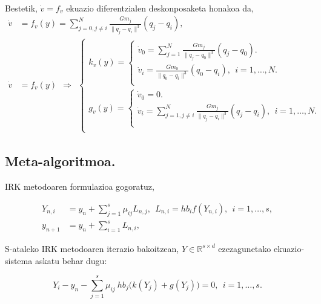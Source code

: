 \paragraph*{}Bestetik, $\dot{v}=f_v$ ekuazio diferentzialen deskonposaketa honakoa da,
\begin{align*}
\dot{v} &=f_v(y)=\sum_{j=0,j \neq i}^{N} \frac{Gm_j}{\|q_j-q_i\|^3} (q_j-q_i), \\
\dot{v} &=f_v(y) \ \ \Rightarrow \ \ 
\left \{ \begin{array}{c}
          k_v(y)=\left \{ \begin{array}{c}
           \dot{v}_0 =\sum_{j=1}^{N} \frac{Gm_j}{\|q_j-q_0\|^3} (q_j-q_0). \\[.30cm]
           \dot{v}_i = \frac{Gm_0}{\|q_0-q_i\|^3} (q_0-q_i), \ \  i=1,\dots,N.\\[.30cm]
         \end{array} \right. \\[.30cm]  
          g_v(y)=\left \{ \begin{array}{c}
             \dot{v}_0=0. \\[.30cm]
             \dot{v}_i= \sum_{j=1,j \neq i}^{N} \frac{Gm_j}{\|q_j-q_i\|^3} (q_j-q_i), \ \  i=1,\dots,N.\\[.30cm]  
           \end{array} \right. \\ 
         \end{array} \right.  
\end{align*}


\subsection*{Meta-algoritmoa.}

IRK metodoaren formulazioa gogoratuz,

\begin{align*}
\label{eq:62b}
Y_{n,i}&=y_n+ \sum\limits_{j=1}^{s} \mu_{ij} L_{n,j},  \ \ L_{n,i}=hb_if(Y_{n,i}), \ \ i=1,\dots,s,\\
y_{n+1}&=y_n+\sum\limits_{i=1}^{s} L_{n,i},
\end{align*}

S-ataleko IRK metodoaren iterazio bakoitzean, $Y \in \mathbb{R}^{s \times d}$ ezezagunetako ekuazio-sistema askatu behar dugu: 

\begin{equation*}
Y_{i}-y_n- \sum\limits_{j=1}^{s} \mu_{ij} \ hb_j \bigg(k(Y_{j})+g(Y_{j})\bigg)=0, \ \ i=1,\dots,s.
\end{equation*}

